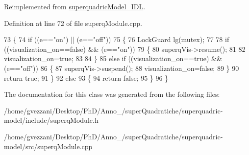 Reimplemented from \hyperlink{classsuperquadricModel__IDL_a651c741e9b01b25d46be96b06b91011d}{superquadric\-Model\-\_\-\-I\-D\-L}.



Definition at line 72 of file superq\-Module.\-cpp.


\begin{DoxyCode}
73 \{
74     \textcolor{keywordflow}{if} ((e==\textcolor{stringliteral}{"on"}) || (e==\textcolor{stringliteral}{"off"}))
75     \{
76         LockGuard lg(mutex);
77 
78         \textcolor{keywordflow}{if} ((visualization\_on==\textcolor{keyword}{false}) && (e==\textcolor{stringliteral}{"on"}))
79         \{
80             superqVis->resume();
81 
82             visualization\_on=\textcolor{keyword}{true};
83 
84         \}
85         \textcolor{keywordflow}{else} \textcolor{keywordflow}{if} ((visualization\_on==\textcolor{keyword}{true}) && (e==\textcolor{stringliteral}{"off"}))
86         \{
87             superqVis->suspend();
88             visualization\_on=\textcolor{keyword}{false};
89         \}
90         \textcolor{keywordflow}{return} \textcolor{keyword}{true};
91     \}
92     \textcolor{keywordflow}{else}
93     \{
94         \textcolor{keywordflow}{return} \textcolor{keyword}{false};
95     \}
96 \}
\end{DoxyCode}


The documentation for this class was generated from the following files\-:\begin{DoxyCompactItemize}
\item 
/home/gvezzani/\-Desktop/\-Ph\-D/\-Anno\-\_/super\-Quadratiche/superquadric-\/model/include/superq\-Module.\-h\item 
/home/gvezzani/\-Desktop/\-Ph\-D/\-Anno\-\_/super\-Quadratiche/superquadric-\/model/src/superq\-Module.\-cpp\end{DoxyCompactItemize}

